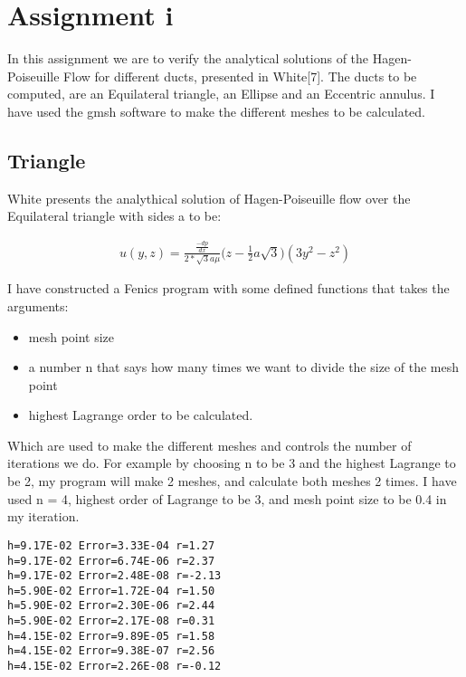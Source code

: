 \documentclass[a4paper,norsk]{article}
\begin{document}
\maketitle
\section*{Assignment i}
In this assignment we are to verify the analytical solutions of the Hagen-Poiseuille Flow for different ducts, presented in White[7]. The ducts to be computed, are an Equilateral triangle, an Ellipse and an Eccentric annulus. I have used the gmsh software to make the different meshes to be calculated. 
\subsection*{Triangle} 
White presents the analythical solution of Hagen-Poiseuille flow over the Equilateral triangle with sides a to be: 

\begin{align*}
	u(y,z) = \frac{\frac{-dp}{dx}}{2*\sqrt{3}a\mu}\Big(z-\frac{1}{2}a\sqrt{3}\Big)
	(3y^2-z^2)
\end{align*}

I have constructed a Fenics program with some defined functions that takes the arguments:
\begin{itemize}
\item{} mesh point size
\item{} a number n that says how many times we want to divide the size of the mesh point
\item{}highest Lagrange order to be calculated. 
\end{itemize}  

Which are used to make the different meshes and controls the number of iterations we do. For example by choosing n to be 3 and the highest Lagrange to be 2, my program will make 2 meshes, and calculate both meshes 2 times. \newline I have used n = 4, highest order of Lagrange to be 3, and mesh point size to be 0.4 in my iteration.

\begin{lstlisting}[style=terminal]
h=9.17E-02 Error=3.33E-04 r=1.27
h=9.17E-02 Error=6.74E-06 r=2.37
h=9.17E-02 Error=2.48E-08 r=-2.13
h=5.90E-02 Error=1.72E-04 r=1.50
h=5.90E-02 Error=2.30E-06 r=2.44
h=5.90E-02 Error=2.17E-08 r=0.31
h=4.15E-02 Error=9.89E-05 r=1.58
h=4.15E-02 Error=9.38E-07 r=2.56
h=4.15E-02 Error=2.26E-08 r=-0.12
\end{lstlisting}
\end{document}
